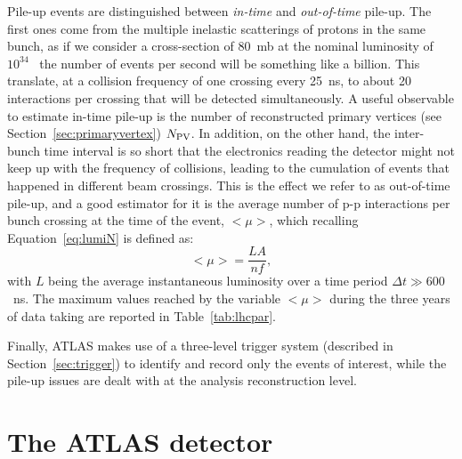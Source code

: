 Pile-up events are distinguished between \textit{in-time} and \textit{out-of-time} pile-up. The first ones come 
from the multiple inelastic scatterings of protons in the same bunch, as if we consider a cross-section of 80~mb
at the nominal luminosity of $10^{34}$~ the number of events per second will be something like
a billion. This translate, at a collision frequency of one crossing every 25~ns, to about 20 interactions per
crossing that will be detected simultaneously. A useful observable to estimate in-time pile-up is
the number of reconstructed primary vertices (see Section~\ref{sec:primaryvertex}) $N_{\rm PV}$.
In addition, on the other hand, the inter-bunch time interval is so short
that the electronics reading the detector might not keep up with the frequency of collisions, leading to the
cumulation of events that happened in different beam crossings. This is the effect we refer to as 
out-of-time pile-up, and a good estimator for it is the average number of p-p interactions
per bunch crossing at the time of the event, $<\mu>$, which recalling Equation~\ref{eq:lumiN} is defined as:
\begin{equation}\label{eq:mu}
<\mu> = \dfrac{LA}{nf},
\end{equation}
with $L$ being the average instantaneous luminosity over a time period $\Delta t\gg 600$~ns.
The maximum values reached by the variable $<\mu>$ during the three years of data taking
are reported in Table~\ref{tab:lhcpar}.

Finally, ATLAS makes use of a three-level trigger system (described in Section~\ref{sec:trigger}) to identify
and record only the events of interest, while the pile-up issues are dealt with at the analysis 
reconstruction level.



\section{The ATLAS detector}\label{sec:atlas}


